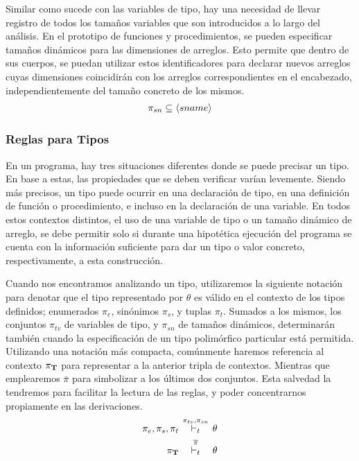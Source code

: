Similar como sucede con las variables de tipo, hay una necesidad de llevar registro de todos los tamaños variables que son introducidos a lo largo del análisis.
En el prototipo de funciones y procedimientos, se pueden especificar tamaños dinámicos para las dimensiones de arreglos.
Esto permite que dentro de sus cuerpos, se puedan utilizar estos identificadores para declarar nuevos arreglos cuyas dimensiones coincidirán con los arreglos correspondientes en el encabezado, independientemente del tamaño concreto de los mismos.
\begin{gather*}
\pi_{sn} \subseteq \langle sname \rangle
\end{gather*}

\subsubsection{Reglas para Tipos}

En un programa, hay tres situaciones diferentes donde se puede precisar un tipo.
En base a estas, las propiedades que se deben verificar varían levemente.
Siendo más precisos, un tipo puede ocurrir en una declaración de tipo, en una definición de función o procedimiento, e incluso en la declaración de una variable.
En todos estos contextos distintos, el uso de una variable de tipo o un tamaño dinámico de arreglo, se debe permitir solo si durante una hipotética ejecución del programa se cuenta con la información suficiente para dar un tipo o valor concreto, respectivamente, a esta construcción.

Cuando nos encontramos analizando un tipo, utilizaremos la siguiente notación para denotar que el tipo representado por $\theta$ es válido en el contexto de los tipos definidos; enumerados $\pi_{e}$, sinónimos $\pi_{s}$, y tuplas $\pi_{t}$.
Sumados a los mismos, los conjuntos $\pi_{tv}$ de variables de tipo, y $\pi_{sn}$ de tamaños dinámicos, determinarán también cuando la especificación de un tipo polimórfico particular está permitida.
Utilizando una notación más compacta, comúnmente haremos referencia al contexto $\pi_{\mathbf{T}}$ para representar a la anterior tripla de contextos.
Mientras que emplearemos $\overline{\pi}$ para simbolizar a los últimos dos conjuntos.
Esta salvedad la tendremos para facilitar la lectura de las reglas, y poder concentrarnos propiamente en las derivaciones.
\begin{align*}
\pi_{e}, \pi_{s}, \pi_{t}
\quad
&\DASH[\mathclap{\pi_{tv}, \pi_{sn}}]{t}
\quad
\theta
\\
\PI{T}
\quad
&\DASH[\overline{\pi}]{t}
\quad
\theta
\end{align*}

